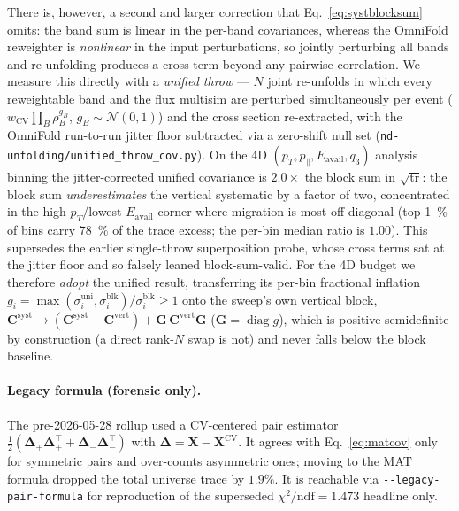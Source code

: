 \documentclass[12pt]{article}
\newcommand{\pT}{p_{T}}
\newcommand{\pPar}{p_{\parallel}}
\newcommand{\Eavail}{E_{\mathrm{avail}}}
\newcommand{\CV}{\text{CV}}
\newcommand{\syst}{\text{syst}}
\newcommand{\T}{^{\!\top}}
\begin{document}
There is, however, a second and larger correction that Eq.~\eqref{eq:systblocksum}
omits: the band sum is linear in the per-band covariances, whereas the OmniFold
reweighter is \emph{nonlinear} in the input perturbations, so jointly perturbing
all bands and re-unfolding produces a cross term beyond any pairwise correlation.
We measure this directly with a \emph{unified throw} --- $N$ joint re-unfolds in
which every reweightable band and the flux multisim are perturbed simultaneously
per event ($w_{\CV}\prod_B\rho_B^{g_B}$, $g_B\sim\mathcal N(0,1)$) and the cross
section re-extracted, with the OmniFold run-to-run jitter floor subtracted via a
zero-shift null set (\texttt{nd-unfolding/unified\_throw\_cov.py}). On the 4D
$(\pT,\pPar,\Eavail,q_3)$ analysis binning the jitter-corrected unified covariance
is $\mathbf{2.0\times}$ the block sum in $\sqrt{\operatorname{tr}}$: the block sum
\emph{underestimates} the vertical systematic by a factor of two, concentrated in
the high-$\pT$/lowest-$\Eavail$ corner where migration is most off-diagonal (top
\SI{1}{\percent} of bins carry \SI{78}{\percent} of the trace excess; the per-bin
median ratio is $1.00$). This supersedes the earlier single-throw superposition
probe, whose cross terms sat at the jitter floor and so falsely leaned
block-sum-valid. For the 4D budget we therefore \emph{adopt} the unified result,
transferring its per-bin fractional inflation
$g_i=\max(\sigma^{\mathrm{uni}}_i,\sigma^{\mathrm{blk}}_i)/\sigma^{\mathrm{blk}}_i\ge1$
onto the sweep's own vertical block,
$\mathbf{C}^{\syst}\!\to\!(\mathbf{C}^{\syst}-\mathbf{C}^{\mathrm{vert}})+\mathbf{G}\,\mathbf{C}^{\mathrm{vert}}\mathbf{G}$
($\mathbf{G}=\operatorname{diag}g$), which is positive-semidefinite by construction
(a direct rank-$N$ swap is not) and never falls below the block baseline.

\paragraph{Legacy formula (forensic only).}
The pre-2026-05-28 rollup used a CV-centered pair estimator
$\tfrac12(\boldsymbol{\Delta}_{+}\boldsymbol{\Delta}_{+}\T +
\boldsymbol{\Delta}_{-}\boldsymbol{\Delta}_{-}\T)$ with
$\boldsymbol{\Delta}=\mathbf{X}-\mathbf{X}^{\CV}$. It agrees with
Eq.~\eqref{eq:matcov} only for symmetric pairs and over-counts
asymmetric ones; moving to the MAT formula dropped the total universe
trace by $1.9\%$. It is reachable via \texttt{-{}-legacy-pair-formula}
for reproduction of the superseded $\chi^{2}/\mathrm{ndf}=1.473$
headline only.
\end{document}

